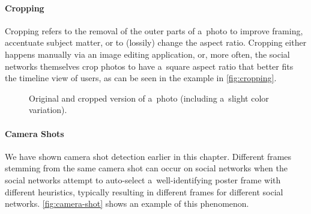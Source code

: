 \paragraph{Cropping}

Cropping refers to the removal of the outer parts of a~photo
to improve framing, accentuate subject matter,
or to (lossily) change the aspect ratio.
Cropping either happens manually via an image editing application,
or, more often, the social networks themselves crop photos
to have a~square aspect ratio
that better fits the timeline view of users,
as can be seen in the example in \autoref{fig:cropping}.

\begin{figure}[h!]
  \centering
  \caption[Original and cropped version of a~photo]
  {Original and cropped version of a~photo (including a~slight color variation).}
  \label{fig:cropping}  
\end{figure}

\paragraph{Camera Shots}

We have shown camera shot detection earlier in this chapter.
Different frames stemming from the same camera shot
can occur on social networks when the social networks attempt to auto-select
a~well-identifying poster frame with different heuristics,
typically resulting in different frames for different social networks.
\autoref{fig:camera-shot} shows an example of this phenomenon.

